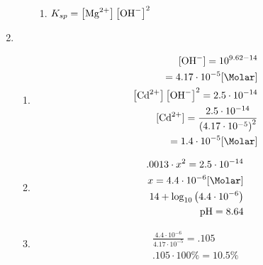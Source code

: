 \documentclass[12pt]{article}
\begin{document}
\begin{enumerate}
\begin{enumerate}
\begin{enumerate}
          \item $K_{sp}=\left[ \ce{Mg^2+} \right]\left[ \ce{OH-} \right]^2$

        \end{enumerate}

    \end{enumerate}

    \setcounter{enumi}{27}

  \item

    \begin{enumerate}

      \item 

        \begin{equation}
          \begin{split}
            [\ce{OH-}]=10^{9.62-14}\\
            =4.17\cdot10^{-5}[\si{\Molar}]\\
            \left[ \ce{Cd^2+} \right]\left[ \ce{OH-} \right]^2=2.5\cdot10^{-14}\\
            [\ce{Cd^2+}]=\frac{2.5\cdot10^{-14}}{\left( 4.17\cdot10^{-5} \right)^2}\\
            =1.4\cdot10^{-5}[\si{\Molar}]
          \end{split}
          \label{1}
        \end{equation}

      \item 

        \begin{equation}
          \begin{split}
            .0013\cdot x^2=2.5\cdot10^{-14}\\
            x=4.4\cdot10^{-6}[\si{\Molar}]\\
            14+\log_{10}\left( 4.4\cdot10^{-6} \right)\\
            \ce{pH}=8.64
          \end{split}
          \label{2}
        \end{equation}

      \item 

        \begin{equation}
          \begin{split}
            \frac{4.4\cdot10^{-6}}{4.17\cdot10^{-5}}=.105\\
            .105\cdot100\%=10.5\%
          \end{split}
          \label{3}
        \end{equation}


\end{enumerate}
\end{enumerate}
\end{document}
